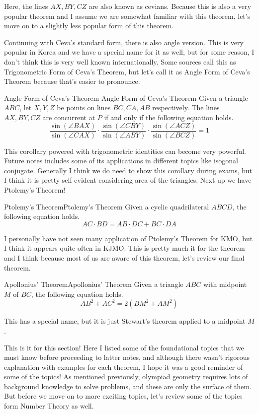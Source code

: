 \documentclass[../../../main.tex]{subfiles}
\begin{document}
Here, the lines $AX, BY, CZ$ are also known as cevians. Because this
is also a very popular theorem and I assume we are somewhat
familiar with this theorem, let's move on to a slightly less
popular form of this theorem.

Continuing with Ceva's standard form, there is also angle version.
This is very popular in Korea and we have a special name for it
as well, but for some reason, I don't think this is very well known
internationally. Some sources call this as Trigonometric Form of
Ceva's Theorem, but let's call it as Angle Form of Ceva's Theorem
because that's easier to pronounce.

\begin{corollary}
{Angle Form of Ceva's Theorem}
{Angle Form of Ceva's Theorem}
Given a triangle $ABC$, let $X, Y, Z$ be points on lines $BC, CA, AB$
respectively. The lines $AX, BY, CZ$ are concurrent at $P$ if and
only if the following equation holds.
\[
\frac{\sin(\angle{BAX})}{\sin(\angle{CAX})}
\cdot \frac{\sin(\angle{CBY})}{\sin(\angle{ABY})}
\cdot \frac{\sin(\angle{ACZ})}{\sin(\angle{BCZ})}
= 1
\]
\end{corollary}

This corollary powered with trigonometric identities can become
very powerful. Future notes includes some of its applications
in different topics like isogonal conjugate. Generally I think
we do need to show this corollary during exams, but I think it
is pretty self evident considering area of the triangles.
Next up we have Ptolemy's Theorem!

\begin{theorem}{Ptolemy's Theorem}{Ptolemy's Theorem}
Given a cyclic quadrilateral $ABCD$, the following equation holds.
\[
AC \cdot BD = AB \cdot DC + BC \cdot DA
\]
\end{theorem}

I personally have not seen many application of Ptolemy's Theorem
for KMO, but I think it appears quite often in KJMO. This is
pretty much it for the theorem and I think because most of us
are aware of this theorem, let's review our final theorem.

\begin{theorem}{Apollonius' Theorem}{Apollonius' Theorem}
Given a triangle $ABC$ with midpoint $M$ of $BC$, the following
equation holds.
\[
AB^2 + AC^2 = 2(BM^2 + AM^2)
\]
\end{theorem}

This has a special name, but it is just Stewart's theorem applied
to a midpoint $M$.

This is it for this section! Here I listed some of the foundational
topics that we must know before proceeding to latter notes,
and although there wasn't rigorous explanation with examples for
each theorem, I hope it was a good reminder of some of the topics!
As mentioned previously, olympiad geometry requires lots of background
knowledge to solve problems, and these are only the surface of them.
But before we move on to more exciting topics, let's review some of
the topics form Number Theory as well.
\end{document}
